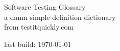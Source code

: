 \documentclass[a4paper, twoside, titlepage]{article}
\begin{document}
\thispagestyle{empty}
{\begingroup
\centering
\vfill
{\Huge Software Testing Glossary}\\[\baselineskip]
{\Large a damn simple definition dictionary}\\ [\baselineskip] 
{from testitquickly.com}\\ [\baselineskip] 

\vfill \null

last build: {\large\scshape \today}\par

\endgroup}

\newpage



\tableofcontents

\newpage

\pagestyle{plain}
\end{document}
